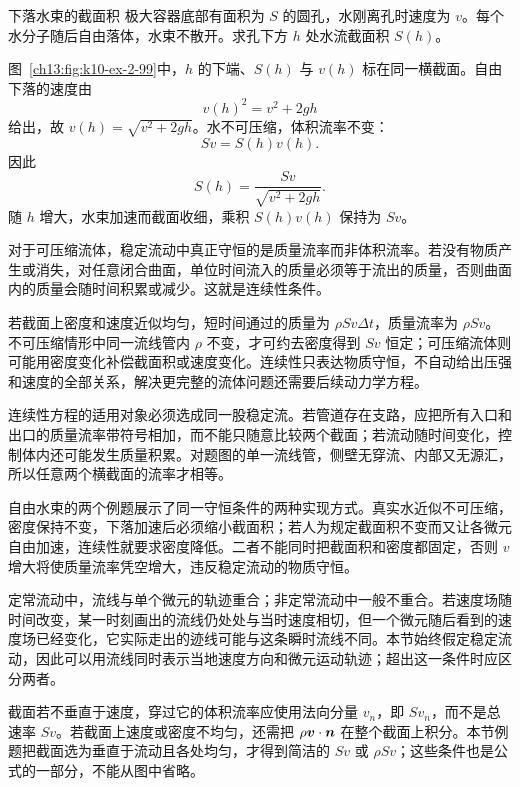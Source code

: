{\begin{origexamplebox}{下落水束的截面积}\label{ch13:ex:k10-2-99}
极大容器底部有面积为 $S$ 的圆孔，水刚离孔时速度为 $v$。每个水分子随后自由落体，水束不散开。求孔下方 $h$ 处水流截面积 $S(h)$。

\FallingJetDiagram
\end{origexamplebox}
\begin{xesolution}
\ThAFallingFlow

图~\ref{ch13:fig:k10-ex-2-99}中，$h$ 的下端、$S(h)$ 与 $v(h)$ 标在同一横截面。自由下落的速度由
\[
v(h)^2=v^2+2gh
\]
给出，故 $v(h)=\sqrt{v^2+2gh}$。水不可压缩，体积流率不变：
\[
Sv=S(h)v(h).
\]
因此
\[
\boxed{S(h)=\frac{Sv}{\sqrt{v^2+2gh}}}.
\]
随 $h$ 增大，水束加速而截面收细，乘积 $S(h)v(h)$ 保持为 $Sv$。
\end{xesolution}

对于可压缩流体，稳定流动中真正守恒的是质量流率而非体积流率。若没有物质产生或消失，对任意闭合曲面，单位时间流入的质量必须等于流出的质量，否则曲面内的质量会随时间积累或减少。这就是连续性条件。

若截面上密度和速度近似均匀，短时间通过的质量为 $\rho Sv\Delta t$，质量流率为 $\rho Sv$。不可压缩情形中同一流线管内 $\rho$ 不变，才可约去密度得到 $Sv$ 恒定；可压缩流体则可能用密度变化补偿截面积或速度变化。连续性只表达物质守恒，不自动给出压强和速度的全部关系，解决更完整的流体问题还需要后续动力学方程。

连续性方程的适用对象必须选成同一股稳定流。若管道存在支路，应把所有入口和出口的质量流率带符号相加，而不能只随意比较两个截面；若流动随时间变化，控制体内还可能发生质量积累。对题图的单一流线管，侧壁无穿流、内部又无源汇，所以任意两个横截面的流率才相等。

自由水束的两个例题展示了同一守恒条件的两种实现方式。真实水近似不可压缩，密度保持不变，下落加速后必须缩小截面积；若人为规定截面积不变而又让各微元自由加速，连续性就要求密度降低。二者不能同时把截面积和密度都固定，否则 $v$ 增大将使质量流率凭空增大，违反稳定流动的物质守恒。

定常流动中，流线与单个微元的轨迹重合；非定常流动中一般不重合。若速度场随时间改变，某一时刻画出的流线仍处处与当时速度相切，但一个微元随后看到的速度场已经变化，它实际走出的迹线可能与这条瞬时流线不同。本节始终假定稳定流动，因此可以用流线同时表示当地速度方向和微元运动轨迹；超出这一条件时应区分两者。

截面若不垂直于速度，穿过它的体积流率应使用法向分量 $v_n$，即 $Sv_n$，而不是总速率 $Sv$。若截面上速度或密度不均匀，还需把 $\rho\bm{v}\cdot\bm{n}$ 在整个截面上积分。本节例题把截面选为垂直于流动且各处均匀，才得到简洁的 $Sv$ 或 $\rho Sv$；这些条件也是公式的一部分，不能从图中省略。

}
